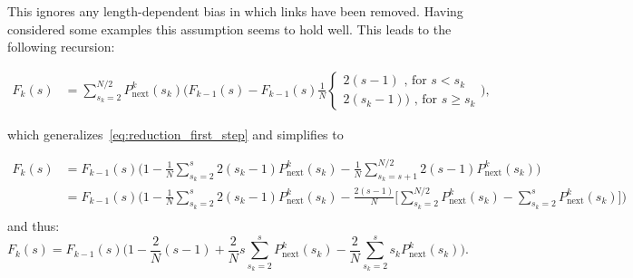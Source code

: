 \documentclass[10pt]{iopart}
\newcommand{\Pin}{P_{\mathrm{next}}}
\begin{document}
This ignores any length-dependent bias in which links have been removed. Having considered some examples this assumption seems to hold well. 
This leads to the following recursion:

\begin{align}
    F_k(s)&= \sum_{s_k=2}^{N/2} \Pin^k(s_k)\nonumber \bigg(F_{k-1}(s) - F_{k-1}(s)\frac{1}{N}
    {\begin{cases}
     2(s-1) \text{ , for } s<s_k\\
     2(s_k -1))\text{ , for } s\geq s_k
    \end{cases}}\bigg),
\end{align}

which generalizes~\ref{eq:reduction_first_step} and simplifies to

\begin{align}
   F_k(s)&=F_{k-1}(s)\Big(1-\frac{1}{N} \sum_{s_k=2}^{s} 2 (s_k-1) \Pin^k(s_k) -\frac{1}{N} \sum_{s_k=s+1}^{N/2} 2 (s-1) \Pin^k(s_k)\Big) \nonumber \\
   &=F_{k-1}(s)\bigg(1-\frac{1}{N}
   \sum_{s_k=2}^{s} 2 (s_k-1) \Pin^k(s_k)-\frac{2 (s-1)}{N} \Big[\sum_{s_k=2}^{N/2} \Pin^k(s_k) - \sum_{s_k=2}^{s} \Pin^k(s_k)\Big]\bigg) \nonumber \\
   \nonumber
\end{align}
and thus:
\begin{equation}
   F_k(s) =  F_{k-1}(s)\Big(1-\frac{2}{N} (s-1) 
   +\frac{2}{N} s
   \sum_{s_k=2}^{s}\Pin^k(s_k) -\frac{2}{N}
   \sum_{s_k=2}^{s} s_k \Pin^k(s_k)\Big).\label{eq.Fk_rec}
\end{equation}
\end{document}
